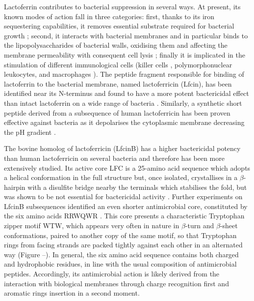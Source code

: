 Lactoferrin contributes to bacterial suppression in several ways. At present, its known modes of action fall in three categories: first, thanks to its iron sequestering capabilities, it removes essential substrate required for bacterial growth \citep{Farnaud2003}; second, it interacts with bacterial membranes and in particular binds to the lipopolysaccharides of bacterial walls, oxidising them and affecting the membrane permeability with consequent cell lysis \citep{Farnaud2003}; finally it is implicated in the stimulation of different immunological cells (killer cells \citep{Shau1992}, polymorphonuclear leukocytes, and macrophages \citep{Gahr1991}).
The peptide fragment responsible for binding of lactoferrin to the bacterial membrane, named lactoferricin (Lfcin), has been identified near its N-terminus and found to have a more potent bactericidal effect than intact lactoferrin on a wide range of bacteria \citep{Gifford2005,Bellamy1992,Tomita1994,Wakabayashi1996}.
%
Similarly, a synthetic short peptide derived from a subsequence of human lactoferricin has been proven effective against bacteria as it depolarises the cytoplasmic membrane decreasing the pH gradient \citep{Aguilera1999}.

The bovine homolog of lactoferricin (LfcinB) has a higher bactericidal potency than human lactoferricin on several bacteria \citep{Cochran2001} and therefore has been more extensively studied. Its active core LFC is a 25-amino acid sequence which adopts a helical conformation in the full structure but, once isolated, crystallises in a $\beta$-hairpin with a disulfite bridge nearby the terminals which stabilises the fold, but was shown to be not essential for bactericidal activity \citep{Cochran2001}.
%
Further experiments on LfcinB subsequences identified an even shorter antimicrobial core, constituted by the six amino acids RRWQWR \citep{Schibli1999}. This core presents a characteristic Tryptophan zipper motif WTW, which appears very often in nature in $\beta$-turn and $\beta$-sheet conformations, paired to another copy of the same motif, so that Tryptophan rings from facing strands are packed tightly against each other in an alternated way \citep{Cochran2001} (Figure --).
In general, the six amino acid sequence contains both charged and hydrophobic residues, in line with the usual composition of antimicrobial peptides. Accordingly, its antimicrobial action is likely derived from the interaction with biological membranes through charge recognition first and aromatic rings insertion in a second moment.


